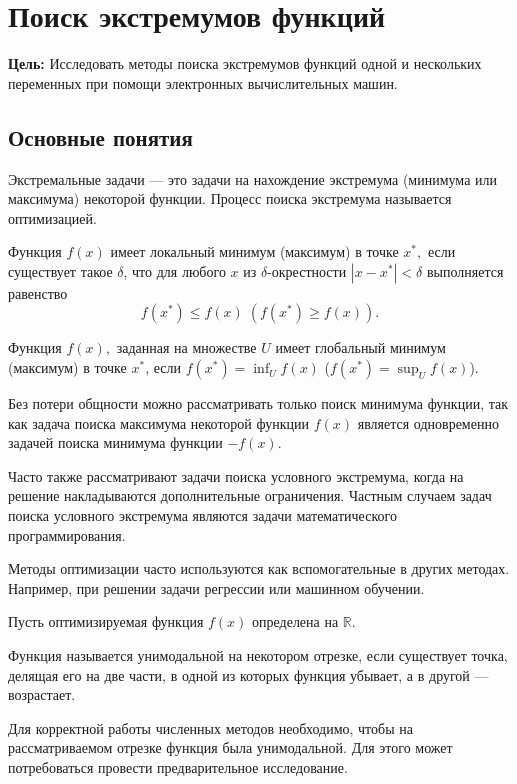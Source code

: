 \section{Поиск экстремумов функций}

\noindent \textbf{Цель:} Исследовать методы поиска экстремумов функций
одной и нескольких переменных при помощи электронных вычислительных
машин.

\medskip{}



\subsection{Основные понятия}

Экстремальные задачи — это задачи на нахождение экстремума (минимума
или максимума) некоторой функции. Процесс поиска экстремума называется
оптимизацией.
\begin{defn}
Функция $f(x)$ имеет локальный минимум (максимум) в точке $x^{*},$
если существует такое $\delta$, что для любого $x$ из $\delta$-окрестности
$|x-x^{*}|<\delta$ выполняется равенство 
\[
f(x^{*})\leqslant f(x)\;(f(x^{*})\geqslant f(x)).
\]

\end{defn}

\begin{defn}
Функция $f(x),$ заданная на множестве $U$ имеет глобальный минимум
(максимум) в точке $x^{*}$, если $f(x^{*})=\inf_{U}f(x)$ ($f(x^{*})=\sup_{U}f(x)$).
\end{defn}
Без потери общности можно рассматривать только поиск минимума функции,
так как задача поиска максимума некоторой функции $f(x)$ является
одновременно задачей поиска минимума функции $-f(x).$

Часто также рассматривают задачи поиска условного экстремума, когда
на решение накладываются дополнительные ограничения. Частным случаем
задач поиска условного экстремума являются задачи математического
программирования.

Методы оптимизации часто используются как вспомогательные в других
методах. Например, при решении задачи регрессии или машинном обучении. 

Пусть оптимизируемая функция $f(x)$ определена на $\mathbb{R}$.
\begin{defn}
Функция называется унимодальной на некотором отрезке, если существует
точка, делящая его на две части, в одной из которых функция убывает,
а в другой — возрастает.
\end{defn}
Для корректной работы численных методов необходимо, чтобы на рассматриваемом
отрезке функция была унимодальной. Для этого может потребоваться провести
предварительное исследование.


